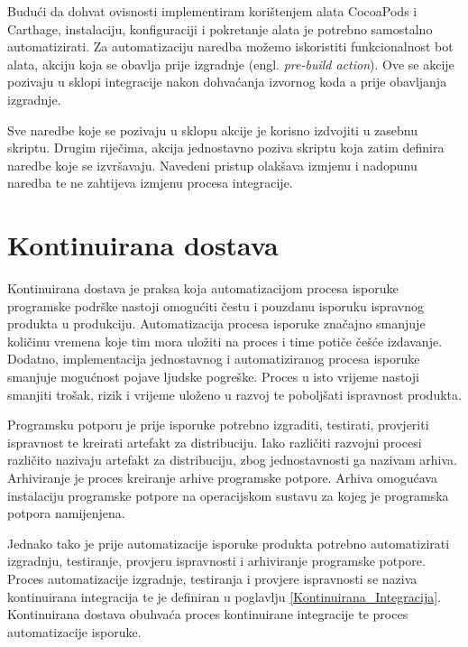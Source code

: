 \documentclass[times, utf8, diplomski, numeric]{fer}
\newcommand{\eng}[1]{(engl. \textit{#1})}
\begin{document}
Budući da dohvat ovisnosti implementiram korištenjem alata CocoaPods i Carthage, instalaciju, konfiguraciji i pokretanje alata je potrebno samostalno automatizirati. Za automatizaciju naredba možemo iskoristiti funkcionalnost bot alata, akciju koja se obavlja prije izgradnje \eng{pre-build action}. Ove se akcije pozivaju u sklopi integracije nakon dohvaćanja izvornog koda a prije obavljanja izgradnje.

Sve naredbe koje se pozivaju u sklopu akcije je korisno izdvojiti u zasebnu skriptu. Drugim riječima, akcija jednostavno poziva skriptu koja zatim definira naredbe koje se izvršavaju. Navedeni pristup olakšava izmjenu i nadopunu naredba te ne zahtijeva izmjenu procesa integracije.





\chapter{Kontinuirana dostava}

Kontinuirana dostava je praksa koja automatizacijom procesa isporuke programske podrške nastoji omogućiti čestu i pouzdanu isporuku ispravnog produkta u produkciju. Automatizacija procesa isporuke značajno smanjuje količinu vremena koje tim mora uložiti na proces i time potiče češće izdavanje. Dodatno, implementacija jednostavnog i automatiziranog procesa isporuke smanjuje mogućnost pojave ljudske pogreške. Proces u isto vrijeme nastoji smanjiti trošak, rizik i vrijeme uloženo u razvoj te poboljšati ispravnost produkta\citep{wiki:ContinuousDelivery}.

Programsku potporu je prije isporuke potrebno izgraditi, testirati, provjeriti ispravnost te kreirati artefakt za distribuciju. Iako različiti razvojni procesi različito nazivaju artefakt za distribuciju, zbog jednostavnosti ga nazivam arhiva. Arhiviranje je proces kreiranje arhive programske potpore. Arhiva omogućava instalaciju programske potpore na operacijskom sustavu za kojeg je programska potpora namijenjena.

Jednako tako je prije automatizacije isporuke produkta potrebno automatizirati izgradnju, testiranje, provjeru ispravnosti i arhiviranje programske potpore. Proces automatizacije izgradnje, testiranja i provjere ispravnosti se naziva kontinuirana integracija te je definiran u poglavlju \ref{Kontinuirana_Integracija}. Kontinuirana dostava obuhvaća proces kontinuirane integracije te proces automatizacije isporuke.
\end{document}
